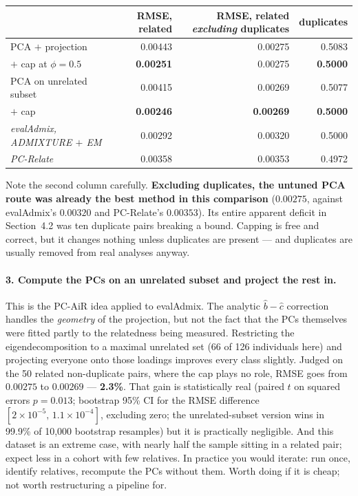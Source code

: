 \documentclass[10pt,a4paper]{article}
\begin{document}
\begin{center}
\small
\begin{tabular}{@{}lrrr@{}}
\toprule
 & RMSE, related & RMSE, related \emph{excluding} duplicates & duplicates \\
\midrule
PCA $+$ projection            & 0.00443 & 0.00275 & 0.5083 \\
\quad $+$ cap at $\phi=0.5$   & \textbf{0.00251} & 0.00275 & \textbf{0.5000} \\
PCA on unrelated subset       & 0.00415 & 0.00269 & 0.5077 \\
\quad $+$ cap                 & \textbf{0.00246} & \textbf{0.00269} & \textbf{0.5000} \\
\midrule
\emph{evalAdmix, ADMIXTURE $+$ EM} & 0.00292 & 0.00320 & 0.5000 \\
\emph{PC-Relate}                   & 0.00358 & 0.00353 & 0.4972 \\
\bottomrule
\end{tabular}
\end{center}

\noindent
Note the second column carefully. \textbf{Excluding duplicates, the untuned PCA route was already the best
method in this comparison} ($0.00275$, against evalAdmix's $0.00320$ and PC-Relate's $0.00353$). Its entire
apparent deficit in Section~4.2 was ten duplicate pairs breaking a bound. Capping is free and correct, but it
changes nothing unless duplicates are present --- and duplicates are usually removed from real analyses
anyway.

\paragraph{3. Compute the PCs on an unrelated subset and project the rest in.} This is the PC-AiR idea
applied to evalAdmix. The analytic $\hat b-\hat c$ correction handles the \emph{geometry} of the projection,
but not the fact that the PCs themselves were fitted partly to the relatedness being measured. Restricting
the eigendecomposition to a maximal unrelated set (66 of 126 individuals here) and projecting everyone onto
those loadings improves every class slightly. Judged on the 50 related non-duplicate pairs, where the cap
plays no role, RMSE goes from $0.00275$ to $0.00269$ --- \textbf{2.3\%}. That gain is statistically real
(paired $t$ on squared errors $p=0.013$; bootstrap 95\% CI for the RMSE difference
$[2\times10^{-5},\,1.1\times10^{-4}]$, excluding zero; the unrelated-subset version wins in 99.9\% of 10{,}000
bootstrap resamples) but it is practically negligible. And this dataset is an extreme case, with nearly half
the sample sitting in a related pair; expect less in a cohort with few relatives. In practice you would
iterate: run once, identify relatives, recompute the PCs without them. Worth doing if it is cheap; not worth
restructuring a pipeline for.
\end{document}
